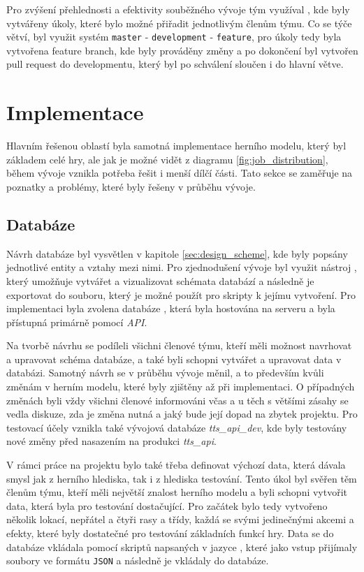 Pro zvýšení přehlednosti a efektivity souběžného vývoje tým využíval , kde byly vytvářeny úkoly, které bylo možné přiřadit jednotlivým členům týmu. Co se týče větví, byl využit systém \texttt{master} - \texttt{development} - \texttt{feature}, pro úkoly tedy byla vytvořena feature branch, kde byly prováděny změny a po dokončení byl vytvořen pull request do developmentu, který byl po schválení sloučen i do hlavní větve.


\section{Implementace}
\label{sec:implementation}

Hlavním řešenou oblastí byla samotná implementace herního modelu, který byl základem celé hry, ale jak je možné vidět z diagramu \ref{fig:job_distribution}, během vývoje vznikla potřeba řešit i menší dílčí části. Tato sekce se zaměřuje na poznatky a problémy, které byly řešeny v průběhu vývoje.

\subsection{Databáze}
\label{subsec:database}

Návrh databáze byl vysvětlen v kapitole \ref{sec:design_scheme}, kde byly popsány jednotlivé entity a vztahy mezi nimi. Pro zjednodušení vývoje byl využit nástroj , který umožňuje vytvářet a vizualizovat schémata databází a následně je exportovat do souboru, který je možné použít pro skripty k jejímu vytvoření. Pro implementaci byla zvolena databáze , která byla hostována na serveru a byla přístupná primárně pomocí \textit{API}.

Na tvorbě návrhu se podíleli všichni členové týmu, kteří měli možnost navrhovat a upravovat schéma databáze, a také byli schopni vytvářet a upravovat data v databázi. Samotný návrh se v průběhu vývoje měnil, a to především kvůli změnám v herním modelu, které byly zjištěny až při implementaci. O případných změnách byli vždy všichni členové informováni včas a u těch s většími zásahy se vedla diskuze, zda je změna nutná a jaký bude její dopad na zbytek projektu. Pro testovací účely vznikla také vývojová databáze \textit{tts\_api\_dev}, kde byly testovány nové změny před nasazením na produkci \textit{tts\_api}.

V rámci práce na projektu bylo také třeba definovat výchozí data, která dávala smysl jak z herního hlediska, tak i z hlediska testování. Tento úkol byl svěřen těm členům týmu, kteří měli největší znalost herního modelu a byli schopni vytvořit data, která byla pro testování dostačující. Pro začátek bylo tedy vytvořeno několik lokací, nepřátel a čtyři rasy a třídy, každá se svými jedinečnými akcemi a efekty, které byly dostatečné pro testování základních funkcí hry. Data se do databáze vkládala pomocí skriptů napsaných v jazyce , které jako vstup přijímaly soubory ve formátu \texttt{JSON} a následně je vkládaly do databáze.


